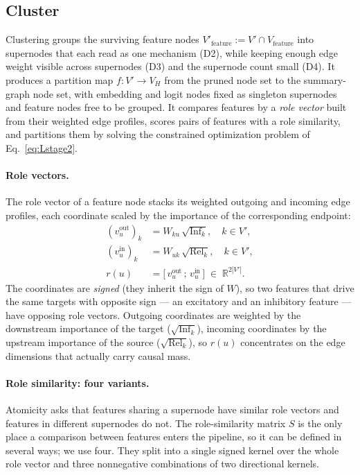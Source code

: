 \documentclass[../main.tex]{subfiles}
\begin{document}
\subsection{Cluster}\label{sec:stage2}
Clustering groups the surviving feature nodes
$V'_{\text{feature}} := V' \cap V_{\text{feature}}$ into supernodes that each read
as one mechanism (D2), while keeping enough edge weight visible across supernodes
(D3) and the supernode count small (D4). It produces a partition map
$f : V' \to V_H$ from the pruned node set to the summary-graph node set, with
embedding and logit nodes fixed as singleton supernodes and feature nodes free to
be grouped. It compares features by a \emph{role vector} built from their weighted
edge profiles, scores pairs of features with a role similarity, and partitions them
by solving the constrained optimization problem of Eq.~\eqref{eq:Lstage2}.

\paragraph{Role vectors.}
The role vector of a feature node stacks its weighted outgoing and
incoming edge profiles, each coordinate scaled by the importance of the
corresponding endpoint:
\begin{align}
(v_u^{\text{out}})_k &= W_{ku}\,\sqrt{\mathrm{Inf}_k}, \quad k \in V', \nonumber\\
(v_u^{\text{in}})_k  &= W_{uk}\,\sqrt{\mathrm{Rel}_k}, \quad k \in V', \nonumber\\
r(u) &= \bigl[\,v_u^{\text{out}}\,;\, v_u^{\text{in}}\,\bigr]
\;\in\; \mathbb{R}^{2|V'|}. \label{eq:role}
\end{align}
The coordinates are \emph{signed} (they inherit the sign of $W$), so two features
that drive the same targets with opposite sign --- an excitatory and an
inhibitory feature --- have opposing role vectors. Outgoing coordinates are
weighted by the downstream importance of the target ($\sqrt{\mathrm{Inf}_k}$),
incoming coordinates by the upstream importance of the source
($\sqrt{\mathrm{Rel}_k}$), so $r(u)$ concentrates on the edge dimensions that
actually carry causal mass.

\paragraph{Role similarity: four variants.}
Atomicity asks that features sharing a supernode have similar role vectors and
features in different supernodes do not. The role-similarity matrix $S$ is the only
place a comparison between features enters the pipeline, so it can be defined in
several ways; we use four. They split into a single signed kernel over the whole role
vector and three nonnegative combinations of two directional kernels.
\end{document}
